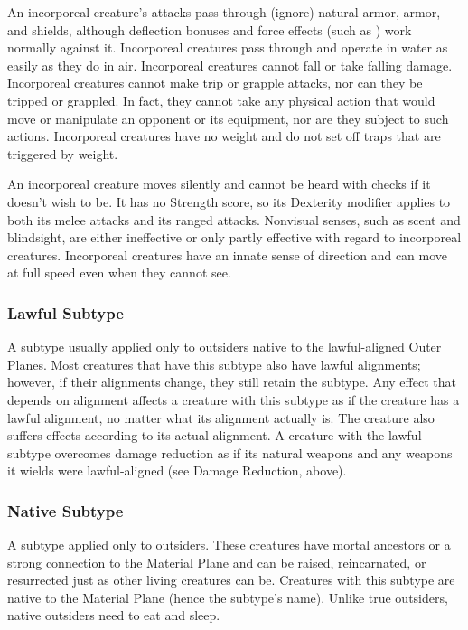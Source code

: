 An incorporeal creature's attacks pass through (ignore) natural armor, armor, and shields, although deflection bonuses and force effects (such as ) work normally against it. Incorporeal creatures pass through and operate in water as easily as they do in air. Incorporeal creatures cannot fall or take falling damage. Incorporeal creatures cannot make trip or grapple attacks, nor can they be tripped or grappled. In fact, they cannot take any physical action that would move or manipulate an opponent or its equipment, nor are they subject to such actions. Incorporeal creatures have no weight and do not set off traps that are triggered by weight.

An incorporeal creature moves silently and cannot be heard with  checks if it doesn't wish to be. It has no Strength score, so its Dexterity modifier applies to both its melee attacks and its ranged attacks. Nonvisual senses, such as scent and blindsight, are either ineffective or only partly effective with regard to incorporeal creatures. Incorporeal creatures have an innate sense of direction and can move at full speed even when they cannot see.

\subsubsection{Lawful Subtype}
A subtype usually applied only to outsiders native to the lawful-aligned Outer Planes. Most creatures that have this subtype also have lawful alignments; however, if their alignments change, they still retain the subtype. Any effect that depends on alignment affects a creature with this subtype as if the creature has a lawful alignment, no matter what its alignment actually is. The creature also suffers effects according to its actual alignment. A creature with the lawful subtype overcomes damage reduction as if its natural weapons and any weapons it wields were lawful-aligned (see Damage Reduction, above).

\subsubsection{Native Subtype}
A subtype applied only to outsiders. These creatures have mortal ancestors or a strong connection to the Material Plane and can be raised, reincarnated, or resurrected just as other living creatures can be. Creatures with this subtype are native to the Material Plane (hence the subtype's name). Unlike true outsiders, native outsiders need to eat and sleep.


